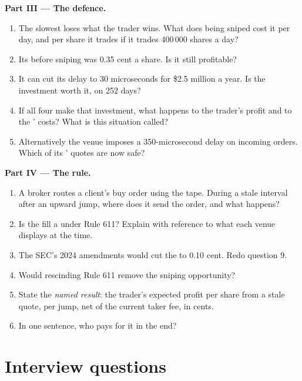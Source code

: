 \begin{problem}
\medskip\noindent\textbf{Part III --- The defence.}
\begin{enumerate}[resume]
\item The slowest  loses what the trader wins. What does being
sniped cost it per day, and per share it trades if it trades 400\,000 shares
a day?
\item Its  before sniping was 0.35 cent a share. Is it still
profitable?
\item It can cut its delay to 30 microseconds for \$2.5 million a year. Is
the investment worth it, on 252 days?
\item If all four  make that investment, what happens to the
trader's profit and to the ' costs? What is this situation
called?
\item Alternatively the venue imposes a 350-microsecond delay on incoming
orders. Which of its ' quotes are now safe?
\end{enumerate}

\medskip\noindent\textbf{Part IV --- The rule.}
\begin{enumerate}[resume]
\item A broker routes a client's buy order using the tape. During a stale
interval after an upward jump, where does it send the order, and what
happens?
\item Is the fill a  under Rule 611? Explain with reference to
what each venue displays at the time.
\item The SEC's 2024 amendments would cut the  to 0.10 cent.
Redo question 9.
\item Would rescinding Rule 611 remove the sniping opportunity?
\item State the \emph{named result}: the trader's expected profit per share
from a stale quote, per jump, net of the current taker fee, in cents.
\item In one sentence, who pays for it in the end?
\end{enumerate}
\end{problem}

\section{Interview questions}

